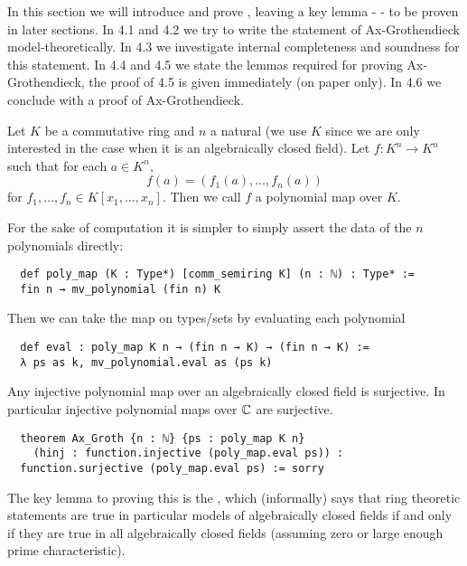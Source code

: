 In this section we will introduce and prove ,
leaving a key lemma -  - to be proven in later sections.
In 4.1 and 4.2 we try to write the statement of Ax-Grothendieck model-theoretically.
In 4.3 we investigate internal completeness and soundness for this statement.
In 4.4 and 4.5 we state the lemmas required for proving Ax-Grothendieck,
the proof of 4.5 is given immediately (on paper only).
In 4.6 we conclude with a proof of Ax-Grothendieck.

\begin{dfn}
  Let $K$ be a commutative ring and $n$ a natural
  (we use $K$ since we are only interested in the case
  when it is an algebraically closed field).
  Let $f : K^n \to K^n$ such that for each $a \in K^n$,
  \[f(a) = (f_1(a), \dots, f_n(a))\] for
  $f_1, \dots, f_n \in K[x_1, \dots, x_n]$.
  Then we call $f$ a polynomial map over $K$.

  For the sake of computation it is simpler to simply assert
  the data of the $n$ polynomials directly:

  \begin{lstlisting}
  def poly_map (K : Type*) [comm_semiring K] (n : ℕ) : Type* :=
  fin n → mv_polynomial (fin n) K \end{lstlisting}

  Then we can take the map on types/sets by evaluating each polynomial
  \begin{lstlisting}
  def eval : poly_map K n → (fin n → K) → (fin n → K) :=
  λ ps as k, mv_polynomial.eval as (ps k) \end{lstlisting}
\end{dfn}

\begin{prop}[Ax-Grothendieck]
    Any injective polynomial map over an algebraically closed field is surjective.
    In particular injective polynomial maps over $\mathbb{C}$ are surjective.

\begin{lstlisting}
  theorem Ax_Groth {n : ℕ} {ps : poly_map K n}
    (hinj : function.injective (poly_map.eval ps)) :
  function.surjective (poly_map.eval ps) := sorry \end{lstlisting}
\end{prop}

The key lemma to proving this is the ,
which (informally) says that ring theoretic statements are true in particular models
of algebraically closed fields if and only if they are true in all algebraically closed fields
(assuming zero or large enough prime characteristic).

